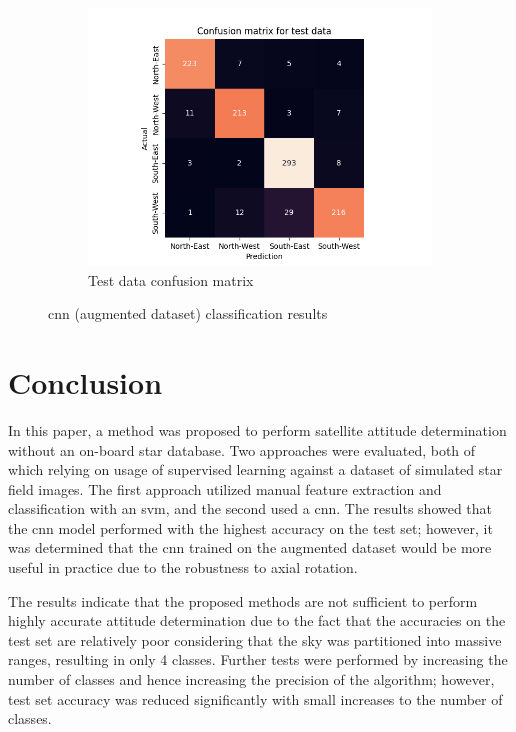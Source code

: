 \documentclass[10pt,twocolumn,letterpaper]{article}
\begin{document}
\begin{figure}
\begin{subfigure}{0.33\linewidth}
    \includegraphics[width=\linewidth, trim={7em, 0em, 9em, 5em}, clip]{cnn_aug_cfsn_test}
    \caption{Test data confusion matrix}
    \label{fig:cnn_test}
  \end{subfigure}
  \caption{\acrshort{cnn} (augmented dataset) classification results}
  \label{fig:cnn_aug_res}
\end{figure}


\section{Conclusion}
\label{sec:conclusion}

In this paper, a method was proposed to perform satellite attitude determination without an on-board star database. Two approaches were evaluated, both of which relying on usage of supervised learning against a dataset of simulated star field images. The first approach utilized manual feature extraction and classification with an \acrshort{svm}, and the second used a \acrshort{cnn}. The results showed that the \acrshort{cnn} model performed with the highest accuracy on the test set; however, it was determined that the \acrshort{cnn} trained on the augmented dataset would be more useful in practice due to the robustness to axial rotation.

The results indicate that the proposed methods are not sufficient to perform highly accurate attitude determination due to the fact that the accuracies on the test set are relatively poor considering that the sky was partitioned into massive ranges, resulting in only 4 classes. Further tests were performed by increasing the number of classes and hence increasing the precision of the algorithm; however, test set accuracy was reduced significantly with small increases to the number of classes.
\end{document}
